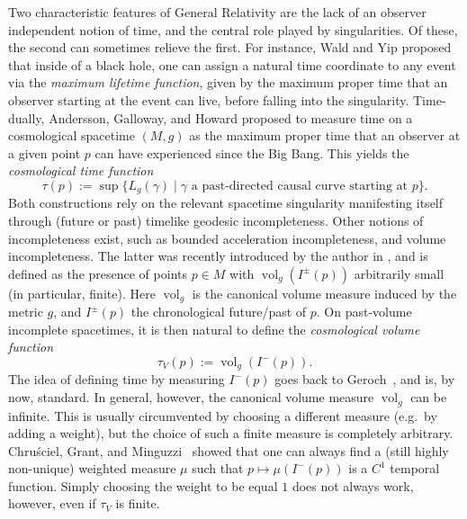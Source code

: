 \documentclass[a4paper,11pt]{amsart}
\newcommand{\Vol}{\operatorname{vol}_g}
\begin{document}
Two characteristic features of General Relativity are the lack of an observer independent notion of time, and the central role played by singularities. Of these, the second can sometimes relieve the first. For instance, Wald and Yip \cite{WaYi81} proposed that inside of a black hole, one can assign a natural time coordinate to any event via the \emph{maximum lifetime function}, given by the maximum proper time that an observer starting at the event can live, before falling into the singularity. Time-dually, Andersson, Galloway, and Howard \cite{AGH98} proposed to measure time on a cosmological spacetime $(M,g)$ as the maximum proper time that an observer at a given point $p$ can have experienced since the Big Bang. This yields the \emph{cosmological time function}
\begin{equation*}
    \tau(p) := \sup \{ L_g(\gamma) \mid \gamma \text{ a past-directed causal curve starting at } p  \}.
\end{equation*}
Both constructions rely on the relevant spacetime singularity manifesting itself through (future or past) timelike geodesic incompleteness. Other notions of incompleteness exist, such as bounded acceleration incompleteness, and volume incompleteness. The latter was recently introduced by the author in \cite{GH23}, and is defined as the presence of points $p \in M$ with $\Vol(I^\pm(p))$ arbitrarily small (in particular, finite). Here $\Vol$ is the canonical volume measure induced by the metric $g$, and $I^\pm(p)$ the chronological future/past of $p$. On past-volume incomplete spacetimes, it is then natural to define the \emph{cosmological volume function} \cite[Def.~6.1]{GH23}
\begin{equation*}
    \tau_V(p) := \Vol(I^-(p)).
\end{equation*}
The idea of defining time by measuring $I^-(p)$ goes back to Geroch~\cite{Ger70}, and is, by now, standard. In general, however, the canonical volume measure $\Vol$ can be infinite. This is usually circumvented by choosing a different measure (e.g.\ by adding a weight), but the choice of such a finite measure is completely arbitrary. Chru\'sciel, Grant, and Minguzzi~\cite{CGM16} showed that one can always find a (still highly non-unique) weighted measure $\mu$ such that $p \mapsto \mu(I^-(p))$ is a $C^1$ temporal function. Simply choosing the weight to be equal $1$ does not always work, however, even if $\tau_V$ is finite.
\end{document}
